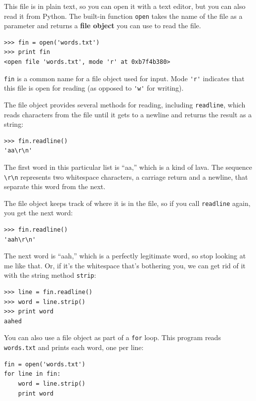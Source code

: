 \documentclass[10pt]{book}
\begin{document}
This file is in plain text, so you can open it with a text
editor, but you can also read it from Python.  The built-in
function {\tt open} takes the name of the file as a parameter
and returns a {\bf file object} you can use to read the file.

\begin{verbatim}
>>> fin = open('words.txt')
>>> print fin
<open file 'words.txt', mode 'r' at 0xb7f4b380>
\end{verbatim}
%
{\tt fin} is a common name for a file object used for
input.  Mode \verb"'r'" indicates that this file is open for
reading (as opposed to \verb"'w'" for writing).

The file object provides several methods for reading, including
{\tt readline}, which reads characters from the file
until it gets to a newline and returns the result as a
string:

\begin{verbatim}
>>> fin.readline()
'aa\r\n'
\end{verbatim}
%
The first word in this particular list is ``aa,'' which is a kind of
lava.  The sequence \verb"\r\n" represents two whitespace characters,
a carriage return and a newline, that separate this word from the
next.

The file object keeps track of where it is in the file, so
if you call {\tt readline} again, you get the next word:

\begin{verbatim}
>>> fin.readline()
'aah\r\n'
\end{verbatim}
%
The next word is ``aah,'' which is a perfectly legitimate
word, so stop looking at me like that.
Or, if it's the whitespace that's bothering you,
we can get rid of it with the string method {\tt strip}:

\begin{verbatim}
>>> line = fin.readline()
>>> word = line.strip()
>>> print word
aahed
\end{verbatim}
%
You can also use a file object as part of a {\tt for} loop.
This program reads {\tt words.txt} and prints each word, one
per line:

\begin{verbatim}
fin = open('words.txt')
for line in fin:
    word = line.strip()
    print word
\end{verbatim}
%
\end{document}
